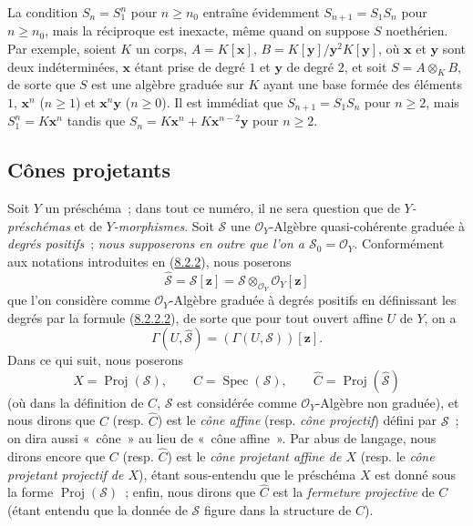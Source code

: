 \begin{remark}[8.2.15]
\label{II.8.2.15-fr}
La condition $S_n=S_1^n$ pour $n\geq n_0$ entraîne évidemment
$S_{n+1}=S_1S_n$ pour $n\geq n_0$, mais la réciproque est inexacte, même
quand on suppose $S$ noethérien. Par exemple, soient $K$ un corps,
$A=K[\mathbf{x}]$, $B=K[\mathbf{y}]/\mathbf{y}^2K[\mathbf{y}]$, où $\mathbf{x}$ et $\mathbf{y}$ sont deux indéterminées, $\mathbf{x}$ étant
prise de degré $1$ et $\mathbf{y}$ de degré $2$, et soit $S=A\otimes_KB$, de sorte que
$S$ est une algèbre graduée sur $K$ ayant une base formée des éléments $1$,
$\mathbf{x}^n$ ($n\geq1$) et $\mathbf{x}^n\mathbf{y}$ ($n\geq0$). Il est immédiat que
$S_{n+1}=S_1S_n$ pour $n\geq2$, mais $S_1^n=K\mathbf{x}^n$ tandis que
$S_n=K\mathbf{x}^n+K\mathbf{x}^{n-2}\mathbf{y}$ pour $n\geq2$.
\end{remark}

\subsection{Cônes projetants}
\label{subsection:II.8.3-fr}

\begin{env}[8.3.1]
\label{II.8.3.1-fr}
Soit $Y$ un préschéma~; dans tout ce numéro, il ne sera question que de
\emph{$Y$-préschémas} et de \emph{$Y$-morphismes}. Soit $\mathcal{S}$ une
$\mathcal{O}_Y$-Algèbre quasi-cohérente graduée à \emph{degrés positifs}~;
\emph{nous supposerons en outre que l'on a $\mathcal{S}_0=\mathcal{O}_Y$}.
Conformément aux notations introduites en
(\hyperref[II.8.2.2-fr]{8.2.2}), nous poserons
\begin{equation}
\label{II.8.3.1.1-fr}
  \widehat{\mathcal{S}}=\mathcal{S}[\mathbf{z}]
  =\mathcal{S}\otimes_{\mathcal{O}_Y}\mathcal{O}_Y[\mathbf{z}]
\tag{8.3.1.1}
\end{equation}
que l'on considère comme $\mathcal{O}_Y$-Algèbre graduée à degrés positifs en
définissant les degrés par la formule
(\hyperref[II.8.2.2.2-fr]{8.2.2.2}), de sorte que pour tout ouvert affine $U$
de $Y$, on a
\[
  \Gamma(U,\widehat{\mathcal{S}})=(\Gamma(U,\mathcal{S}))[\mathbf{z}].
\]
Dans ce qui suit, nous poserons
\begin{equation}
\label{II.8.3.1.2-fr}
  X=\operatorname{Proj}(\mathcal{S}),\qquad
  C=\operatorname{Spec}(\mathcal{S}),\qquad
  \widehat{C}=\operatorname{Proj}(\widehat{\mathcal{S}})
\tag{8.3.1.2}
\end{equation}
(où dans la définition de $C$, $\mathcal{S}$ est considérée comme
$\mathcal{O}_Y$-Algèbre non graduée), et nous dirons que $C$ (resp.
$\widehat{C}$) est le \emph{cône affine} (resp. \emph{cône projectif}) défini
par $\mathcal{S}$~; on dira aussi «~cône~» au lieu de «~cône affine~». Par
abus de langage, nous dirons encore que $C$ (resp. $\widehat{C}$) est le
\emph{cône projetant affine de $X$} (resp. le \emph{cône projetant projectif
de $X$}), étant sous-entendu que le préschéma $X$ est donné sous la forme
$\operatorname{Proj}(\mathcal{S})$~; enfin, nous dirons que $\widehat{C}$ est
la \emph{fermeture projective} de $C$ (étant entendu que la donnée de
$\mathcal{S}$ figure dans la structure de $C$).
\end{env}

